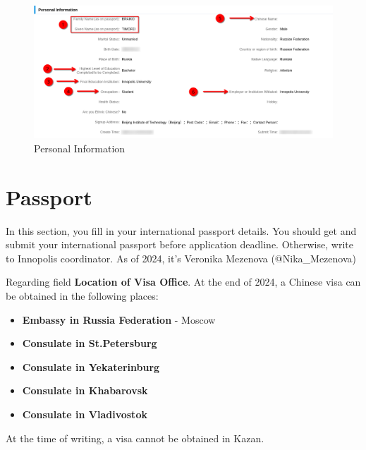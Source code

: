 \begin{figure}[H]
    \centering
    \includegraphics[width=\textwidth]{01_russia/imgs/app_4_personal_info}
    \caption{\centering Personal Information}
    \label{fig:ru_pers_info}
\end{figure}









\section{Passport}\label{sec:ru_passport}

In this section, you fill in your international passport details.
You should get and submit your international passport before application deadline.
Otherwise, write to Innopolis coordinator.
As of 2024, it's Veronika Mezenova (@Nika\_Mezenova)

Regarding field \textbf{Location of Visa Office}.
At the end of 2024, a Chinese visa can be obtained in the following places:

\begin{itemize}
    \item \textbf{Embassy in Russia Federation} - Moscow
    \item \textbf{Consulate in St.Petersburg}
    \item \textbf{Consulate in Yekaterinburg}
    \item \textbf{Consulate in Khabarovsk}
    \item \textbf{Consulate in Vladivostok}
\end{itemize}


\begin{note}
    At the time of writing, a visa cannot be obtained in Kazan.
\end{note}









